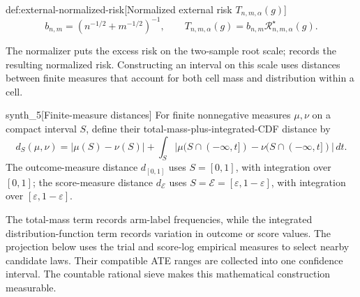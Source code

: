 \begin{definitionv}{def:external-normalized-risk}[Normalized external risk $T_{n,m,\alpha}(g)$]
\[
b_{n,m}=\left(n^{-1/2}+m^{-1/2}\right)^{-1},
\qquad
T_{n,m,\alpha}(g)=b_{n,m}\mathcal R^{\star}_{n,m,\alpha}(g).
\]
\end{definitionv}

The normalizer  puts the excess risk on the two-sample root scale;  records the resulting normalized risk. Constructing an interval on this scale uses distances between finite measures that account for both cell mass and distribution within a cell.

\begin{definitionv}{synth_5}[Finite-measure distances]
For finite nonnegative measures \(\mu,\nu\) on a compact interval \(S\), define their total-mass-plus-integrated-CDF distance by
\[
d_S(\mu,\nu)
=
|\mu(S)-\nu(S)|
+
\int_S
\bigl|\mu(S\cap(-\infty,t])-\nu(S\cap(-\infty,t])\bigr|\,dt.
\]
The outcome-measure distance \(d_{[0,1]}\) uses \(S=[0,1]\), with integration over \([0,1]\); the score-measure distance \(d_{\mathcal E}\) uses \(S=\mathcal E=[\varepsilon,1-\varepsilon]\), with integration over \([\varepsilon,1-\varepsilon]\).
\end{definitionv}

The total-mass term records arm-label frequencies, while the integrated distribution-function term records variation in outcome or score values. The projection below uses the trial and score-log empirical measures to select nearby candidate laws. Their compatible ATE ranges are collected into one confidence interval. The countable rational sieve makes this mathematical construction measurable.

